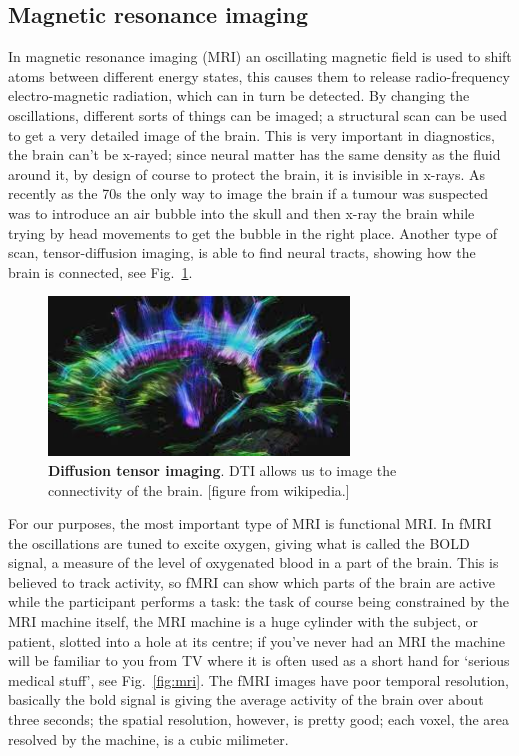 \documentclass[12pt]{article}
\begin{document}
\subsection*{Magnetic resonance imaging}

In magnetic resonance imaging (MRI) an oscillating magnetic field is
used to shift atoms between different energy states, this causes them
to release radio-frequency electro-magnetic radiation, which can in
turn be detected. By changing the oscillations, different sorts of
things can be imaged; a structural scan can be used to get a very
detailed image of the brain. This is very important in diagnostics,
the brain can't be x-rayed; since neural matter has the same density
as the fluid around it, by design of course to protect the brain, it
is invisible in x-rays. As recently as the 70s the only way to image
the brain if a tumour was suspected was to introduce an air bubble
into the skull and then x-ray the brain while trying by head movements
to get the bubble in the right place. Another type of scan,
tensor-diffusion imaging, is able to find neural tracts, showing how the brain is connected, see Fig.~\ref{fig:dti}.


\begin{figure}
  \begin{center}
    \includegraphics[width=8cm]{dti.jpeg}
    \end{center}
  \caption{\textbf{Diffusion tensor imaging}. DTI allows us to image the connectivity of the brain. [figure from wikipedia.]\label{fig:dti}}
\end{figure}

For our purposes, the most important type of MRI is functional MRI. In
fMRI the oscillations are tuned to excite oxygen, giving what is
called the BOLD signal, a measure of the level of oxygenated blood in
a part of the brain. This is believed to track activity, so fMRI can
show which parts of the brain are active while the participant
performs a task: the task of course being constrained by the MRI
machine itself, the MRI machine is a huge cylinder with the subject,
or patient, slotted into a hole at its centre; if you've never had an
MRI the machine will be familiar to you from TV where it is often used
as a short hand for `serious medical stuff', see
Fig.~\ref{fig:mri}. The fMRI images have poor temporal resolution,
basically the bold signal is giving the average activity of the brain
over about three seconds; the spatial resolution, however, is pretty
good; each voxel, the area resolved by the machine, is a cubic
milimeter.
\end{document}
